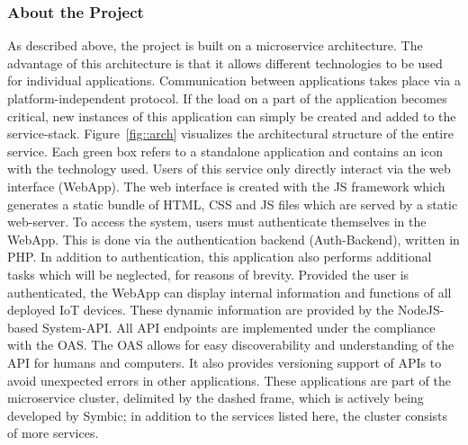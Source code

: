         \subsubsection{About the Project}\label{ssec::project}
        
        \noindent As described above, the project is built on a microservice architecture. The advantage of this architecture is that it allows different technologies to be used for individual applications. Communication between applications takes place via a platform-independent protocol. If the load on a part of the application becomes critical, new instances of this application can simply be created and added to the service-stack.\newline
        Figure~\ref{fig::arch} visualizes the architectural structure of the entire service. Each green box refers to a standalone application and contains an icon with the technology used. Users of this service only directly interact via the web interface (WebApp). The web interface is created with the \ac{JS} framework  which generates a static bundle of HTML, CSS and \ac{JS} files which are served by a static web-server. To access the system, users must authenticate themselves in the WebApp. This is done via the authentication backend (Auth-Backend), written in PHP. In addition to authentication, this application also performs additional tasks which will be neglected, for reasons of brevity. Provided the user is authenticated, the WebApp can display internal information and functions of all deployed \ac{IoT} devices. These dynamic information are provided by the NodeJS-based System-\ac{API}. All \ac{API} endpoints are implemented under the compliance with the \ac{OAS}. The \ac{OAS} allows for easy discoverability and understanding of the \ac{API} for humans and computers. It also provides versioning support of \ac{API}s to avoid unexpected errors in other applications. These applications are part of the microservice cluster, delimited by the dashed frame, which is actively being developed by Symbic; in addition to the services listed here, the cluster consists of more services.\newline
